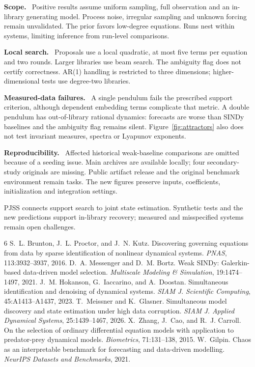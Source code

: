 \documentclass[letterpaper,10pt]{article}
\makeatletter
\newcommand{\lead}[1]{\par\smallskip\noindent\textbf{#1}\ }
\renewcommand\section{\@startsection{section}{1}{\z@}{-2.1ex plus -0.4ex minus -0.2ex}{0.9ex plus 0.2ex}{\normalfont\large\bfseries}}
\makeatother
\begin{document}
\begin{minipage}[t]{0.478\textwidth}\vspace{0pt}
\section{Limitations and conclusions}
\lead{Scope.} Positive results assume uniform sampling, full observation and an in-library generating model. Process noise, irregular sampling and unknown forcing remain unvalidated. The prior favors low-degree equations. Runs nest within systems, limiting inference from run-level comparisons.

\lead{Local search.} Proposals use a local quadratic, at most five terms per equation and two rounds. Larger libraries use beam search. The ambiguity flag does not certify correctness. AR(1) handling is restricted to three dimensions; higher-dimensional tests use degree-two libraries.

\lead{Measured-data failures.} A single pendulum fails the prescribed support criterion, although dependent embedding terms complicate that metric. A double pendulum has out-of-library rational dynamics: forecasts are worse than SINDy baselines and the ambiguity flag remains silent. Figure~\ref{fig:attractors} also does not test invariant measures, spectra or Lyapunov exponents.

\lead{Reproducibility.} Affected historical weak-baseline comparisons are omitted because of a seeding issue. Main archives are available locally; four secondary-study originals are missing. Public artifact release and the original benchmark environment remain tasks. The new figures preserve inputs, coefficients, initialization and integration settings.

PJSS connects support search to joint state estimation. Synthetic tests and the new predictions support in-library recovery; measured and misspecified systems remain open challenges.

\begin{thebibliography}{6}
\small
{} S.~L. Brunton, J.~L. Proctor, and J.~N. Kutz. Discovering governing equations from data by sparse identification of nonlinear dynamical systems. \emph{PNAS}, 113:3932--3937, 2016.
 D.~A. Messenger and D.~M. Bortz. Weak SINDy: Galerkin-based data-driven model selection. \emph{Multiscale Modeling \& Simulation}, 19:1474--1497, 2021.
 J.~M. Hokanson, G.~Iaccarino, and A.~Doostan. Simultaneous identification and denoising of dynamical systems. \emph{SIAM J. Scientific Computing}, 45:A1413--A1437, 2023.
 T.~Meissner and K.~Glasner. Simultaneous model discovery and state estimation under high data corruption. \emph{SIAM J. Applied Dynamical Systems}, 25:1439--1467, 2026.
 X.~Zhang, J.~Cao, and R.~J. Carroll. On the selection of ordinary differential equation models with application to predator-prey dynamical models. \emph{Biometrics}, 71:131--138, 2015.
 W.~Gilpin. Chaos as an interpretable benchmark for forecasting and data-driven modelling. \emph{NeurIPS Datasets and Benchmarks}, 2021.
\end{thebibliography}
\end{minipage}
\end{document}
